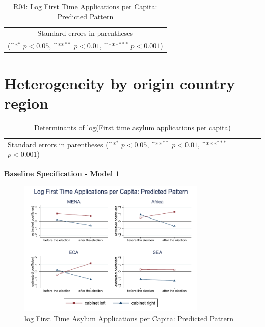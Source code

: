 \documentclass[10pt,a4paper]{scrartcl}
\begin{document}
\begin{table}[!ht]\centering
	\footnotesize
	\renewcommand{\arraystretch}{1.2}
	\def\sym#1{\ifmmode^{#1}\else\(^{#1}\)\fi}
	\caption{R04: Log First Time Applications per Capita: Predicted Pattern}
	\begin{tabular}{l*{2}{c}}
		\hline\hline
		
		\hline\hline
		\multicolumn{3}{c}{\footnotesize Standard errors in parentheses} \\
		\multicolumn{3}{c}{\footnotesize (\sym{*} \(p<0.05\), \sym{**} \(p<0.01\), \sym{***} \(p<0.001\))} \\
	\end{tabular}
\end{table}




\clearpage
\FloatBarrier
\section{Heterogeneity by origin country region}
\begin{table}[!ht]\centering
	\renewcommand{\arraystretch}{1.25}
	\small
	\def\sym#1{\ifmmode^{#1}\else\(^{#1}\)\fi}
	\caption{Determinants of log(First time asylum applications per capita)}
	\begin{tabular}{l*{4}{c}}
		\hline\hline
		
		\hline\hline
		\multicolumn{5}{l}{\footnotesize Standard errors in parentheses (\sym{*} \(p<0.05\), \sym{**} \(p<0.01\), \sym{***} \(p<0.001\))}\\
	\end{tabular}
\end{table}

\clearpage
\textbf{Baseline Specification - Model 1}
\begin{figure}[!ht]
	\centering
	\includegraphics[width=0.8\textwidth]{figures_edited/app_graph1_by_region.pdf}
	\caption{log First Time Asylum Applications per Capita: Predicted Pattern}
\end{figure}
\end{document}
